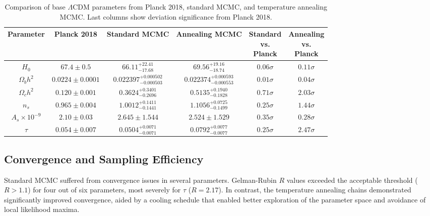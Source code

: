 \documentclass[11pt]{article}
\theoremstyle{definition}
\begin{document}
\renewcommand{\arraystretch}{1.4}
\setlength{\tabcolsep}{3pt} %
\renewcommand{\arraystretch}{1.8} %
\begin{table}[h]
\centering

\label{tab:final_comparison_clean}
\begin{tabular}{c c c c c c}
\toprule
\textbf{Parameter} &
\textbf{Planck 2018} &
\textbf{Standard MCMC} &
\textbf{Annealing MCMC} &
\makecell{\textbf{Standard}\\\textbf{vs.}\\\textbf{Planck}} &
\makecell{\textbf{Annealing}\\\textbf{vs.}\\\textbf{Planck}} \\
\midrule
$H_0$ &
$67.4 \pm 0.5$ &
$66.11^{+22.41}_{-17.68}$ &
$69.56^{+19.16}_{-18.74}$ &
$0.06\sigma$ & $0.11\sigma$ \\
$\Omega_b h^2$ &
$0.0224 \pm 0.0001$ &
$0.022397^{+0.000502}_{-0.000503}$ &
$0.022374^{+0.000593}_{-0.000553}$ &
$0.01\sigma$ & $0.04\sigma$ \\
$\Omega_c h^2$ &
$0.120 \pm 0.001$ &
$0.3624^{+0.3401}_{-0.2696}$ &
$0.5135^{+0.1940}_{-0.1828}$ &
$0.71\sigma$ & $2.03\sigma$ \\
$n_s$ &
$0.965 \pm 0.004$ &
$1.0012^{+0.1411}_{-0.1441}$ &
$1.1056^{+0.0725}_{-0.1499}$ &
$0.25\sigma$ & $1.44\sigma$ \\
$A_s\times10^{-9}$ &
$2.10 \pm 0.03$ &
$2.645 \pm 1.544$ &
$2.524 \pm 1.529$ &
$0.35\sigma$ & $0.28\sigma$ \\
$\tau$ &
$0.054 \pm 0.007$ &
$0.0504^{+0.0071}_{-0.0071}$ &
$0.0792^{+0.0077}_{-0.0077}$ &
$0.25\sigma$ & $2.47\sigma$ \\
\bottomrule
\end{tabular}
\caption{Comparison of base $\Lambda$CDM parameters from Planck 2018, standard MCMC, and temperature annealing MCMC. Last columns show deviation significance from Planck 2018.}
\end{table}


\bigskip

\subsection{Convergence and Sampling Efficiency}

Standard MCMC suffered from convergence issues in several parameters. Gelman-Rubin $R\hat{}$ values exceeded the acceptable threshold ($R\hat{} > 1.1$) for four out of six parameters, most severely for $\tau$ ($R\hat{} = 2.17$). In contrast, the temperature annealing chains demonstrated significantly improved convergence, aided by a cooling schedule that enabled better exploration of the parameter space and avoidance of local likelihood maxima.
\end{document}
